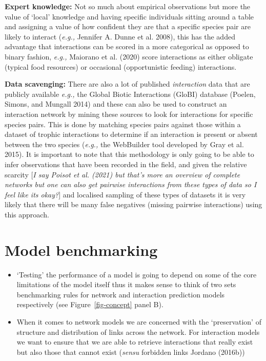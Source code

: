 \documentclass[
  letterpaper,
  DIV=11,
  numbers=noendperiod]{scrartcl}
\begin{document}
\textbf{Expert knowledge:} Not so much about empirical observations but
more the value of `local' knowledge and having specific individuals
sitting around a table and assigning a value of how confident they are
that a specific species pair are likely to interact (\emph{e.g.,}
Jennifer A. Dunne et al. 2008), this has the added advantage that
interactions can be scored in a more categorical as opposed to binary
fashion, \emph{e.g.,} Maiorano et al. (2020) score interactions as
either obligate (typical food resources) or occasional (opportunistic
feeding) interactions.

\textbf{Data scavenging:} There are also a lot of published
\emph{interaction} data that are publicly available \emph{e.g.,} the
Global Biotic Interactions (GloBI) database (Poelen, Simons, and Mungall
2014) and these can also be used to construct an interaction network by
mining these sources to look for interactions for specific species
pairs. This is done by matching species pairs against those within a
dataset of trophic interactions to determine if an interaction is
present or absent between the two species (\emph{e.g.,} the WebBuilder
tool developed by Gray et al. 2015). It is important to note that this
methodology is only going to be able to infer observations that have
been recorded in the field, and given the relative scarcity {[}\emph{I
say Poisot et al. (2021) but that's more an overview of complete
networks but one can also get pairwise interactions from these types of
data so I feel like its okay?}{]} and localised sampling of these types
of datasets it is very likely that there will be many false negatives
(missing pairwise interactions) using this approach.

\section{Model benchmarking}\label{model-benchmarking}

\begin{itemize}
\item
  `Testing' the performance of a model is going to depend on some of the
  core limitations of the model itself thus it makes sense to think of
  two sets benchmarking rules for network and interaction prediction
  models respectively (see Figure~\ref{fig-concept} panel B).
\item
  When it comes to network models we are concerned with the
  `preservation' of structure and distribution of links across the
  network. For interaction models we want to ensure that we are able to
  retrieve interactions that really exist but also those that cannot
  exist (\emph{sensu} forbidden links Jordano (2016b))
\end{itemize}
\end{document}
